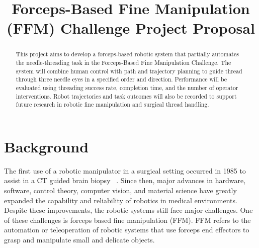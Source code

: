 \documentclass[conference]{IEEEtran}
\begin{document}
\title{Forceps-Based Fine Manipulation (FFM) Challenge Project Proposal}

\author{
\and
{}
\and
{}
}

\maketitle

\begin{abstract}
This project aims to develop a forceps-based robotic system that partially automates the needle-threading task in the Forceps-Based Fine Manipulation Challenge. The system will combine human control with path and trajectory planning to guide thread through three needle eyes in a specified order and direction. Performance will be evaluated using threading success rate, completion time, and the number of operator interventions. Robot trajectories and task outcomes will also be recorded to support future research in robotic fine manipulation and surgical thread handling.

\end{abstract}

\section{Background}
The first use of a robotic manipulator in a surgical setting occurred in 1985 to assist in a CT guided brain biopsy ~\cite{morrell2021}. Since then, major advances in hardware, software, control theory, computer vision, and material science have greatly expanded the capability and reliability of robotics in medical environments. Despite these improvements, the robotic systems still face major challenges. One of these challenges is forceps based fine manipulation (FFM). FFM refers to the automation or teleoperation of robotic systems that use forceps end effectors to grasp and manipulate small and delicate objects.
\end{document}
